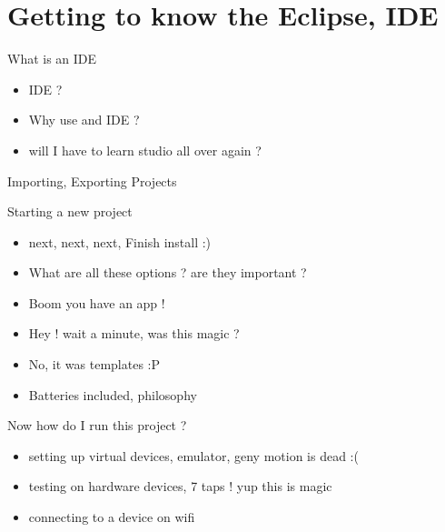 \documentclass[11pt]{beamer}
\begin{document}
\section{Getting to know the Eclipse, IDE}

\begin{frame}[containsverbatim]{What is an IDE}
	\begin{flushleft}
	\begin{itemize}
	
		\item IDE ? 
		\item Why use and IDE ?
		\item will I have to learn studio all over again ?

	\end{itemize}	
	\end{flushleft}
\end{frame}

\begin{frame}[containsverbatim]{Importing, Exporting Projects}

\end{frame}

\begin{frame}[containsverbatim]{Starting a new project}
	\begin{flushleft}
	\begin{itemize}
	
		\item next, next, next, Finish install :)
		\item What are all these options ? are they important ?
		\item Boom you have an app !
		\item Hey ! wait a minute, was this magic ? 
		\item No, it was templates :P
		\item Batteries included, philosophy 
	\end{itemize}
	\end{flushleft}

\end{frame}

\begin{frame}[containsverbatim]{Now how do I run this project ?}
	\begin{flushleft}
	\begin{itemize}
		\item setting up virtual devices, emulator, geny motion is dead :(
		\item testing on hardware devices, 7 taps ! yup this is magic
		\item connecting to a device on wifi  
	\end{itemize}
	\end{flushleft}

\end{frame}
\end{document}
